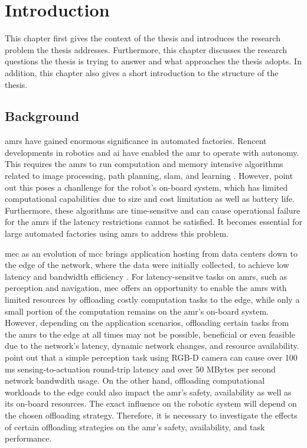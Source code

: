 \chapter{Introduction}

This chapter first gives the context of the thesis and introduces the research problem the thesis addresses. Furthermore, this chapter discusses the research questions the thesis is trying to answer and what approaches the thesis adopts. In addition, this chapter also gives a short introduction to the structure of the thesis.

\section{Background}

\glspl{amr} have gained enormous significance in automated factories. Rencent developments in robotics and \gls{ai} have enabled the \gls{amr} to operate with autonomy. This requires the \glspl{amr} to run computation and memory intensive algorithms related to image processing, path planning, \gls{slam}, and learning \cite{Saeik2021}. However, \citeauthor*{Baxi2022} point out this poses a chanllenge for the robot's on-board system, which has limited computational capabilities due to size and cost limitation as well as battery life. Furthermore, these algorithms are time-sensitve and can cause operational failure for the \glspl{amr} if the latency restrictions cannot be satisfied. It becomes essential for large automated factories using \glspl{amr} to address this problem. 


\gls{mec} as an evolution of \gls*{mcc} brings application hosting from data centers down to the edge of the network, where the data were initially collected, to achieve low latency and bandwidth efficiency \cite{Lin2019}. For latency-sensitve tasks on \glspl{amr}, such as perception and navigation, \gls{mec} offers an opportunity to enable the \glspl{amr} with limited resources by offloading costly computation tasks to the edge, while only a small portion of the computation remains on the \gls{amr}'s on-board system. However, depending on the application scenarios, offloading certain tasks from the \glspl{amr} to the edge at all times may not be possible, beneficial or even feasible due to the network's latency, dynamic network changes, and resource availability. \citeauthor*{Baxi2022} point out that a simple perception task using RGB-D camera can cause over 100 ms sensing-to-actuation round-trip latency and over 50 MBytes per second network bandwdith usage. On the other hand, offloading computational workloads to the edge could also impact the \gls{amr}'s safety, availability as well as its on-board resources. The exact influence on the robotic system will depend on the chosen offloading strategy. Therefore, it is necessary to investigate the effects of certain offloading strategies on the \gls{amr}'s safety, availability, and task performance.

